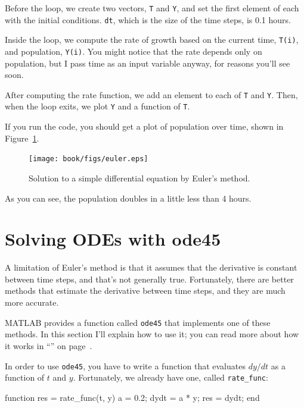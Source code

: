 Before the loop, we create two vectors, {\tt T} and {\tt Y}, and set the first element of each with the initial conditions.  {\tt dt}, which is the size of the time steps, is 0.1 hours.

Inside the loop, we compute the rate of growth based on the current time, {\tt T(i)}, and population, {\tt Y(i)}.  You might notice that the rate depends only on population, but I pass time as an input variable anyway, for reasons you'll see soon.

After computing the rate function, we add an element to each of {\tt T} and {\tt Y}.  Then, when the loop exits, we plot {\tt Y} and a function of {\tt T}.

If you run the code, you should get a plot of population over time, shown in Figure~\ref{fig:euler}. 

\begin{figure}[ht]
\centerline{\texttt{[image: book/figs/euler.eps]}}
\caption{Solution to a simple differential equation by Euler's method.}
\label{fig:euler}
\end{figure}

As you can see, the population doubles in a little less than 4 hours.


\section{Solving ODEs with ode45}
\label{ode45}

A limitation of Euler's method is that it assumes that the derivative is constant between time steps, and that's not generally true.  Fortunately, there are better methods that estimate the derivative between time steps, and they are much more accurate.


MATLAB provides a function called {\tt ode45} that implements one of these methods.  In this section I'll explain how to use it; you can read more about how it works in ``'' on page~\pageref{howode45}.


In order to use {\tt ode45}, you have to write a function that evaluates $dy/dt$ as a function of $t$ and $y$.  Fortunately, we already have one, called \verb"rate_func":

\begin{code}
function res = rate_func(t, y)
   a = 0.2;
   dydt = a * y;
   res = dydt;
end
\end{code}

